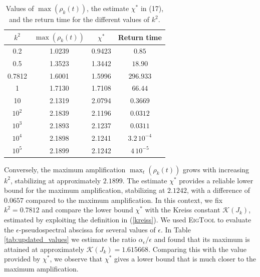 \documentclass{article}
\newcommand{\jac}{J_{k}}
\begin{document}
\begin{table}[ht]
\centering
\caption{Values of \( \max(\rho_{k}(t)) \), the estimate \( \chi^* \) in (17), and the return time for the different values of \( k^2 \).}
\label{tab:amplification_return_time}
\vspace{0.2cm}
\begin{tabular}{|c|c|c|c|}
\hline
\( k^2 \) & \( \max(\rho_{k}(t)) \) & \( \chi^* \) & Return time \\ \hline
0.2      & 1.0239                     & 0.9423       & \( 0.85 \)   \\ \hline
0.5      & 1.3523                     & 1.3442       & \( 18.90 \)   \\ \hline
0.7812   & 1.6001                     & 1.5996       & \( 296.933 \)   \\ \hline
1        & 1.7130                     & 1.7108       & \( 66.44 \)   \\ \hline
10       & 2.1319                     & 2.0794       & \( 0.3669 \)   \\ \hline
$10^2$   & 2.1839                     & 2.1196       & \( 0.0312 \)   \\ \hline
$10^3$   & 2.1893                     & 2.1237       & \( 0.0311 \)   \\ \hline
$10^4$   & 2.1898                     & 2.1241       & \( 3.2\,10^{-4} \)   \\ \hline
$10^5$   & 2.1899                     & 2.1242       & \( 4\,10^{-5} \)   \\ \hline
\end{tabular}
\end{table}



 
 Conversely, the maximum amplification $\max_t(\rho_{k}(t))$ grows with increasing $k^2$, stabilizing at approximately $2.1899$. The estimate $\chi^*$ provides a reliable lower bound for the maximum amplification, stabilizing at $2.1242$, with a difference of $0.0657$ compared to the maximum amplification. In this context, we fix $k^2 = 0.7812$ and compare the lower bound $\chi^*$ with the Kreiss constant $\mathcal{K}(\jac)$, estimated by exploiting the definition in (\ref{kreiss}). We used \textsc{EigTool} \cite{wright2002eigtool} to evaluate the $\epsilon$-pseudospectral abscissa for several values of $\epsilon$. In Table \ref{tab:updated_values} we estimate the ratio $\alpha_\epsilon / \epsilon$ and found that its maximum is attained at approximately $\mathcal{K}(\jac) = 1.615668$. Comparing this with the value provided by $\chi^*$, we observe that $\chi^*$ gives a lower bound that is much closer to the maximum amplification.
\end{document}
